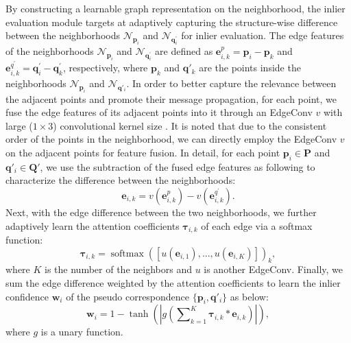\documentclass[letterpaper]{article} %
\begin{document}
	By constructing a learnable graph representation on the neighborhood, the inlier evaluation module targets at adaptively capturing the structure-wise difference between the neighborhoods $\mathcal{N}_{\mathbf{p}_i}$ and $\mathcal{N}_{\mathbf{q}^{\prime}_i}$ for inlier evaluation.
	The edge features of the neighborhoods $\mathcal{N}_{\mathbf{p}_i}$ and $\mathcal{N}_{\mathbf{q}^{\prime}_i}$ are defined as $\mathbf{e}^{p}_{i,k} = \mathbf{p}_i - \mathbf{p}_k$ and $\mathbf{e}^{q^{\prime}}_{i,k} = \mathbf{q}^{\prime}_i - \mathbf{q}^{\prime}_k$, respectively, where $\mathbf{p}_k$ and $\mathbf{q}'_k$ are the points inside the neighborhoods $\mathcal{N}_{\mathbf{p}_i}$ and $\mathcal{N}_{\mathbf{q}'_i}$. 
	In order to better capture the relevance between the adjacent points and promote their message propagation, for each point, we fuse the edge features of its adjacent points into it through an EdgeConv $v$ with large ($1\times 3$) convolutional kernel size \cite{wang2019dynamic}. 
	It is noted that due to the consistent order of the points in the neighborhood, we can directly employ the EdgeConv $v$ on the adjacent points for feature fusion.
	In detail, for each point $\mathbf{p}_i\in \mathbf{P}$ and $\mathbf{q}'_i\in\mathbf{Q}'$, we use the subtraction of the fused edge features as following to characterize the difference between the neighborhoods:
	\begin{equation}\label{e0}
	\mathbf{e}_{i,k} = v \left(\mathbf{e}^{p}_{i,k}\right) - v \left(\mathbf{e}^{q^{\prime}}_{i,k}\right).
	\end{equation}
	Next, with the edge difference between the two neighborhoods, we further adaptively learn the attention coefficients $\bm{\tau}_{i,k}$ of each edge via a softmax function:
	\begin{equation}\label{eq8}
	\bm{\tau}_{i,k} = \operatorname{softmax} \left(\left[u\left(\mathbf{e}_{i,1}\right),...,u\left(\mathbf{e}_{i,K}\right)\right]\right)_k,
	\end{equation}
	where $K$ is the number of the neighbors and $u$ is another EdgeConv.
	Finally, we sum the edge difference weighted by the attention coefficients to learn the inlier confidence $\mathbf{w}_{i}$ of the pseudo correspondence $\{\mathbf{p}_i,\mathbf{q}'_i\}$ as below:
	\begin{equation}\label{eq9}
	\mathbf{w}_{i} = 1 - \operatorname{tanh}\left(\left|g \left(\sum\nolimits_{k=1}^{K}\mathbf{\tau}_{i,k} * \mathbf{e}_{i,k}\right) \right|\right),
	\end{equation} 
	where $g$ is a unary function.
	
\end{document}
